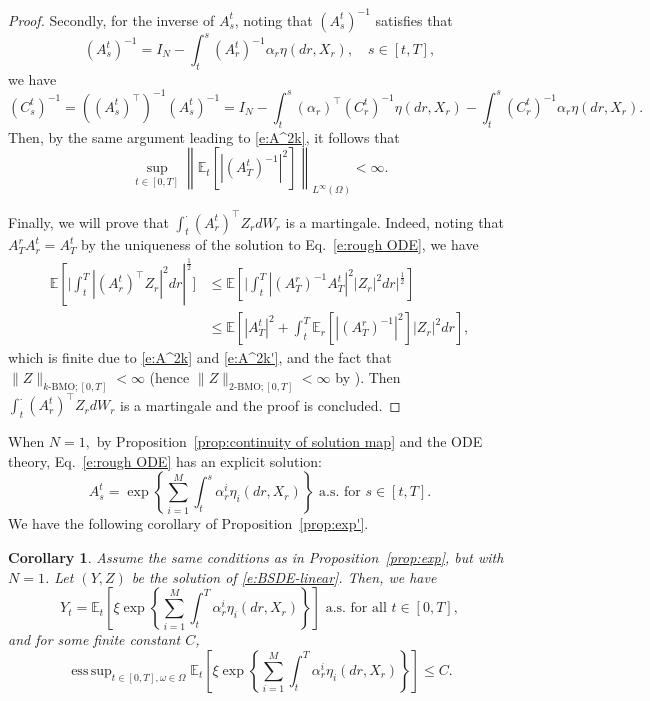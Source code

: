 \documentclass[11pt,reqno]{amsart}
\newtheorem{corollary}{Corollary}[section]
\DeclareMathOperator*{\esssup}{ess\,sup}
\numberwithin{equation}{section}
\begin{document}
\begin{proof}
Secondly, for the inverse of $A^{t}_{s}$, noting that $(A^{t}_{s})^{-1}$ satisfies that 
\[(A^{t}_{s})^{-1} = I_{N} - \int_{t}^{s}(A^{t}_r)^{-1}\alpha_r\eta(dr,X_r),\quad s\in[t,T],\]
we have  
\[(C^{t}_{s})^{-1} = ((A^{t}_s)^{\top})^{-1}(A^{t}_{s})^{-1} = I_{N} - \int_{t}^{s}(\alpha_r)^{\top}(C^{t}_{r})^{-1} \eta(dr,X_r) - \int_{t}^{s}(C^{t}_{r})^{-1}\alpha_r \eta(dr,X_r). \]
Then, by the same argument leading to \eqref{e:A^2k}, it follows that
\begin{equation}\label{e:A^2k'}
\sup_{t\in[0,T]}\left\|\mathbb{E}_{t}\left[|(A^{t}_{T})^{-1}|^{2}\right]\right\|_{L^{\infty}(\Omega)}<\infty.
\end{equation}

Finally, we will prove that $\int_{t}^{\cdot}(A^{t}_{r})^{\top} Z_{r} dW_r$ is a martingale. Indeed, noting that $A^{r}_{T}A^{t}_{r} = A^{t}_{T}$ by the uniqueness of the solution to Eq.~\eqref{e:rough ODE}, we have \begin{equation}\label{e:martingale}
\begin{aligned}
\mathbb{E}\left[\Big|\int_{t}^{T}|(A^{t}_{r})^{\top}Z_{r}|^{2}dr\right|^{\frac{1}{2}}\Big] &\le\mathbb{E}\left[\Big|\int_{t}^{T}\left|(A^{r}_{T})^{-1}A^{t}_{T}\right|^{2}|Z_{r}|^{2}dr\Big|^{\frac{1}{2}}\right]\\
&\le \mathbb{E}\left[|A_T^t|^2+ \int_{t}^{T}\mathbb{E}_{r}\left[|(A_T^r)^{-1}|^2\right] |Z_{r}|^{2}dr\right],
\end{aligned}
\end{equation}
which is finite due to \eqref{e:A^2k} and \eqref{e:A^2k'}, and the fact that $\|Z\|_{k\text{-BMO};[0,T]}<\infty$ (hence $\|Z\|_{2\text{-BMO};[0,T]}<\infty$ by \cite[Corollary~2.1]{kazamaki1994continuous}). Then $\int_{t}^{\cdot}(A^{t}_{r})^{\top}Z_{r}dW_{r}$ is a  martingale and the proof is concluded. 
\end{proof}

When $N=1,$ by Proposition~\ref{prop:continuity of solution map} and the ODE theory, Eq.~\eqref{e:rough ODE} has an explicit solution:
\[A_s^{t} = \exp\left\{\sum_{i=1}^{M}\int_{t}^{s}\alpha^{i}_{r}\eta_{i}(dr,X_{r})\right\} \text{ a.s. for }  s\in[t,T].
\]
We have the following corollary of Proposition~\ref{prop:exp'}. 

\begin{corollary}\label{cor:exp'}
Assume the same conditions as in Proposition~\ref{prop:exp}, but with $N=1$. Let $(Y,Z)$ be the solution of \eqref{e:BSDE-linear}. Then, we have 
\begin{equation*}
Y_{t} = \mathbb{E}_{t}\left[\xi\exp\left\{\sum_{i=1}^{M}\int_{t}^{T}\alpha^{i}_{r}\eta_{i}(dr,X_{r})\right\}\right] \text{ a.s. for all }  t\in[0,T],
\end{equation*} 
and for some finite constant $C$, 
\begin{equation*}    \esssup_{t\in[0,T],\omega\in\Omega}\mathbb{E}_t\left[\xi\exp\left\{\sum_{i=1}^{M}\int_{t}^{T}\alpha^{i}_{r}\eta_{i}(dr,X_{r})\right\}\right]\le C.
\end{equation*}
\end{corollary}
\end{document}
